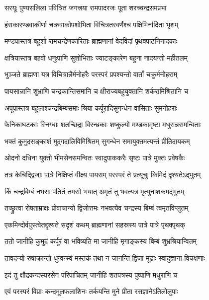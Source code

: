 \twolineshloka
{सरयूः पुण्यसलिला पवित्रित जगत्त्रया}
{रामपादरजः पूता शरच्चन्द्रसमप्रभा}%

\twolineshloka
{हंसकारण्डवाकीर्णा चक्रवाकोपशोभिता}
{विचित्रतरवर्णैश्च पक्षिभिर्नादिता भृशम्}%

\twolineshloka
{मण्डपास्तत्र बहुशो रामचन्द्रेणकारिताः}
{ब्राह्मणानां वेदविदां पृथक्पाठनिनादकाः}%

\twolineshloka
{क्षत्रियास्तत्र बहवो धनुःपाणि सुशोभिताः}
{ज्याटङ्कारेण बहुना नादयन्तो महीतलम्}%

\twolineshloka
{भुञ्जते ब्राह्मणा यत्र विचित्रान्नैर्मनोहरैः}
{परस्परं प्रपश्यन्तो वार्तां चक्रुर्मनोहराम्}%

\twolineshloka
{पायसान्नानि शुभ्राणि चन्द्रकान्तिसमानि च}
{क्षीराज्यबहुयुक्तानि शर्करामिश्रितानि च}%

\twolineshloka
{अपूपास्तत्र बहुलाश्चन्द्रबिम्बसमाः श्रिया}
{कर्पूरादिसुगन्धेन वासिताः सुमनोहराः}%

\twolineshloka
{फेनिकाघटकाः स्निग्धाः शतच्छिद्रा विरन्ध्रकाः}
{शष्कुल्यो मण्डकामृष्टा मधुरान्नसमन्विताः}%

\twolineshloka
{भक्तं कुमुदसङ्काशं मुद्गदालिविमिश्रितम्}
{सुगन्धेन समायुक्तमत्यन्तं प्रीतिदायकम्}%

\twolineshloka
{ओदनो दधिना युक्तो भीमसेनसमन्वितः}
{स्वादुपाककरैः सृष्टः पात्रे मुक्तः प्रवेषकैः}%

\twolineshloka
{तत्र केचिद्द्विजाः पात्रे निक्षिप्तं वीक्ष्य पायसम्}
{परस्परं ते प्रत्यूचुः किमिदं दृश्यतेऽद्भुतम्}%

\twolineshloka
{किं चन्द्रबिम्बं नभसः पतितं तमसो भयात्}
{अमृतं तु भवत्यत्र मृत्युनाशकमद्भुतम्}%

\twolineshloka
{तच्छ्रुत्वा रोषताम्राक्षः प्रोवाचान्यो द्विजोत्तमः}
{नभवत्येव चन्द्रस्य बिम्बं त्वमृतविप्लुतम्}%

\twolineshloka
{एकमिन्दोर्वपुस्त्वेतद्दृश्यते सदृशं कथम्}
{ब्राह्मणानां सहस्रस्य पात्रे पात्रे पृथक्पृथक्}%

\twolineshloka
{ततो जानीहि कुमुदं कर्पूरं वा भविष्यति}
{मा जानीहि मृगाङ्कस्य बिम्बं शुभ्रश्रियान्वितम्}%

\twolineshloka
{तावदन्यो रुषाक्रान्तो धुन्वन्स्वं मस्तकं तथा}
{न जानन्ति द्विजा मूढाः स्वादुज्ञाना विचक्षणाः}%

\twolineshloka
{इदं तु क्षौद्रकन्दस्यरसेन परिपाचितम्}
{जानीहि शतपत्रस्य पुष्पाणि मधुराणि च}%

\twolineshloka
{एवं परस्परं विप्राः कन्दमूलफलाशिनः}
{तर्कयन्ति मुने प्रीता रसज्ञानेऽतिलोलुपाः}%

